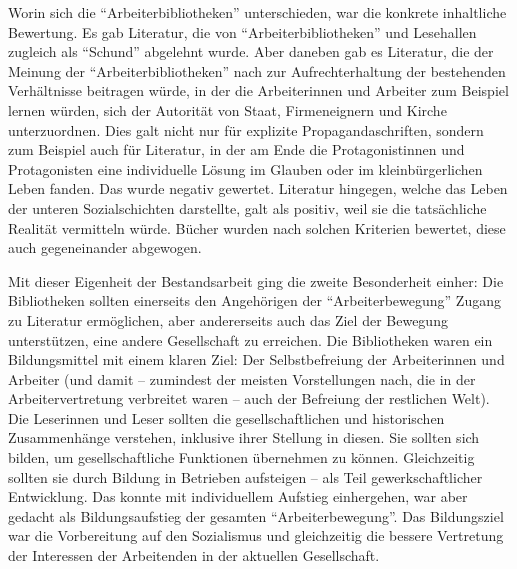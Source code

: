 \documentclass[a4paper,
fontsize=11pt,
oneside,
numbers=noperiodatend,
parskip=half-,
bibliography=totoc,
final
]{scrartcl}
\begin{document}
Worin sich die \enquote{Arbeiterbibliotheken} unterschieden, war die
konkrete inhaltliche Bewertung. Es gab Literatur, die von
\enquote{Arbeiterbibliotheken} und Lesehallen zugleich als
\enquote{Schund} abgelehnt wurde. Aber daneben gab es Literatur, die der
Meinung der \enquote{Arbeiterbibliotheken} nach zur Aufrechterhaltung
der bestehenden Verhältnisse beitragen würde, in der die Arbeiterinnen
und Arbeiter zum Beispiel lernen würden, sich der Autorität von Staat,
Firmeneignern und Kirche unterzuordnen. Dies galt nicht nur für
explizite Propagandaschriften, sondern zum Beispiel auch für Literatur,
in der am Ende die Protagonistinnen und Protagonisten eine individuelle
Lösung im Glauben oder im kleinbürgerlichen Leben fanden. Das wurde
negativ gewertet. Literatur hingegen, welche das Leben der unteren
Sozialschichten darstellte, galt als positiv, weil sie die tatsächliche
Realität vermitteln würde. Bücher wurden nach solchen Kriterien
bewertet, diese auch gegeneinander abgewogen.

Mit dieser Eigenheit der Bestandsarbeit ging die zweite Besonderheit
einher: Die Bibliotheken sollten einerseits den Angehörigen der
\enquote{Arbeiterbewegung} Zugang zu Literatur ermöglichen, aber
andererseits auch das Ziel der Bewegung unterstützen, eine andere
Gesellschaft zu erreichen. Die Bibliotheken waren ein Bildungsmittel mit
einem klaren Ziel: Der Selbstbefreiung der Arbeiterinnen und Arbeiter
(und damit -- zumindest der meisten Vorstellungen nach, die in der
Arbeitervertretung verbreitet waren -- auch der Befreiung der restlichen
Welt). Die Leserinnen und Leser sollten die gesellschaftlichen und
historischen Zusammenhänge verstehen, inklusive ihrer Stellung in
diesen. Sie sollten sich bilden, um gesellschaftliche Funktionen
übernehmen zu können. Gleichzeitig sollten sie durch Bildung in
Betrieben aufsteigen -- als Teil gewerkschaftlicher Entwicklung. Das
konnte mit individuellem Aufstieg einhergehen, war aber gedacht als
Bildungsaufstieg der gesamten \enquote{Arbeiterbewegung}. Das
Bildungsziel war die Vorbereitung auf den Sozialismus und gleichzeitig
die bessere Vertretung der Interessen der Arbeitenden in der aktuellen
Gesellschaft.
\end{document}
